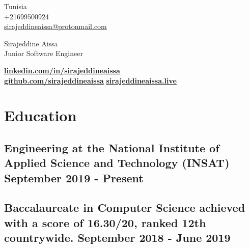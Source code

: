 \documentclass[a4,10pt]{article}
\begin{document}
\begin{center}
    \begin{minipage}[b]{0.24\textwidth}
            \large Tunisia \\
            \large +21699500924 \\
            \large \href{mailto:sirajeddineaissa@protonmail.com}{sirajeddineaissa@protonmail.com} 
    \end{minipage}%
    \begin{minipage}[b]{0.5\textwidth}
            \centering
            {\HUGE Sirajeddine Aissa} \\ %
            \vspace{0.1cm}
            {\color{UI_blue} \Large{Junior Software Engineer}} \\
    \end{minipage}%
    \begin{minipage}[b]{0.24\textwidth}
            \flushright \large  %
            {\href{https://www.linkedin.com/in/sirajeddineaissa}{\small \textbf {linkedin.com/in/sirajeddineaissa}} } \\
            \href{https://github.com/sirajeddineaissa}{\small \textbf {github.com/sirajeddineaissa}}
             \href{https://sirajeddineaissa.live}{\small \textbf {sirajeddineaissa.live}}
    \end{minipage}   
    
\vspace{-0.15cm} 
\end{center}


\section{Education }
\subsection*{Engineering {\normalsize \normalfont   at the National Institute of Applied Science and Technology (INSAT)} \hfill September 2019 - Present} 
\vspace{0.1cm}
\subsection*{Baccalaureate in Computer Science {\normalsize \normalfont   achieved with a score of 16.30/20, ranked 12th countrywide. } \hfill September 2018 - June 2019} 
\vspace{0.2cm}
\end{document}
